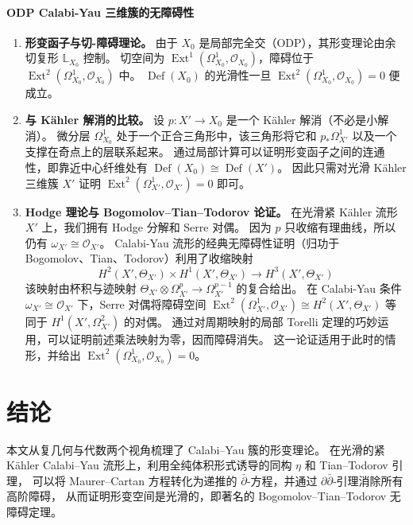 \subsubsection{ODP Calabi-Yau 三维簇的无障碍性}\label{wri}

\begin{enumerate}
    \item \textbf{形变函子与切-障碍理论。}
    由于 \(X_0\) 是局部完全交（ODP），其形变理论由余切复形 \(\mathbb{L}_{X_0}\) 控制。
    切空间为 \(\operatorname{Ext}^1(\Omega_{X_0}^1,\mathcal{O}_{X_0})\)，障碍位于 \(\operatorname{Ext}^2(\Omega_{X_0}^1,\mathcal{O}_{X_0})\) 中。
    \(\operatorname{Def}(X_0)\) 的光滑性一旦 \(\operatorname{Ext}^2(\Omega_{X_0}^1,\mathcal{O}_{X_0})=0\) 便成立。
    
    \item \textbf{与 Kähler 解消的比较。}
    设 \(p\colon X'\to X_0\) 是一个 Kähler 解消（不必是小解消）。
    微分层 \(\Omega_{X_0}^1\) 处于一个正合三角形中，该三角形将它和 \(p_*\Omega_{X'}^1\) 以及一个支撑在奇点上的层联系起来。
    通过局部计算可以证明形变函子之间的连通性，即靠近中心纤维处有 \(\operatorname{Def}(X_0)\cong \operatorname{Def}(X')\)。
    因此只需对光滑 Kähler 三维簇 \(X'\) 证明 \(\operatorname{Ext}^2(\Omega_{X'}^1,\mathcal{O}_{X'}) =0\) 即可。

    \item \textbf{Hodge 理论与 Bogomolov--Tian--Todorov 论证。}
    在光滑紧 Kähler 流形 \(X'\) 上，我们拥有 Hodge 分解和 Serre 对偶。
    因为 \(p\) 只收缩有理曲线，所以仍有 \(\omega_{X'}\cong\mathcal{O}_{X'}\)。
    Calabi-Yau 流形的经典无障碍性证明（归功于 Bogomolov、Tian、Todorov）利用了收缩映射
    \[
        H^2(X',\Theta_{X'})\times H^1(X',\Theta_{X'})\to H^3(X',\Theta_{X'})
    \]
    该映射由杯积与迹映射 \(\Theta_{X'}\otimes\Omega_{X'}^p\to \Omega_{X'}^{p-1}\) 的复合给出。
    在 Calabi-Yau 条件 \(\omega_{X'}\cong\mathcal{O}_{X'}\) 下，Serre 对偶将障碍空间 \(\operatorname{Ext}^2(\Omega_{X'}^1,\mathcal{O}_{X'})\cong H^2(X',\Theta_{X'})\) 等同于 \(H^1(X',\Omega_{X'}^2)\) 的对偶。
    通过对周期映射的局部 Torelli 定理的巧妙运用，可以证明前述乘法映射为零，因而障碍消失。
    这一论证适用于此时的情形，并给出 \(\operatorname{Ext}^2(\Omega_{X_0}^1,\mathcal{O}_{X_0})=0\)。
\end{enumerate}

\chapter{结论}

本文从复几何与代数两个视角梳理了 Calabi–Yau 簇的形变理论。
在光滑的紧 Kähler Calabi–Yau 流形上，利用全纯体积形式诱导的同构 \(\eta\) 和 Tian–Todorov 引理，
可以将 Maurer–Cartan 方程转化为递推的 \(\bar\partial\)‑方程，并通过 \(\partial\bar\partial\)‑引理消除所有高阶障碍，
从而证明形变空间是光滑的，即著名的 Bogomolov–Tian–Todorov 无障碍定理。

